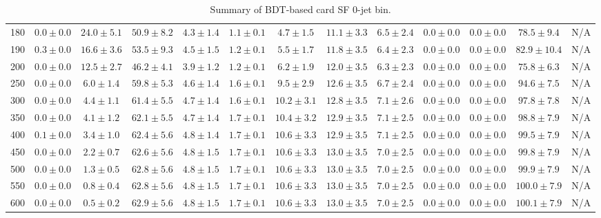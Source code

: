 \begin{table}
{\begin{center}
\begin{tabular}{l | c c | c c c c c c c c  | c c}
180 & $0.0\pm0.0$ & $24.0\pm5.1$ & $50.9\pm8.2$ & $4.3\pm1.4$ & $1.1\pm0.1$ & $4.7\pm1.5$ & $11.1\pm3.3$ & $6.5\pm2.4$ & $0.0\pm0.0$ & $0.0\pm0.0$ & $78.5\pm9.4$ & N/A \\
190 & $0.3\pm0.0$ & $16.6\pm3.6$ & $53.5\pm9.3$ & $4.5\pm1.5$ & $1.2\pm0.1$ & $5.5\pm1.7$ & $11.8\pm3.5$ & $6.4\pm2.3$ & $0.0\pm0.0$ & $0.0\pm0.0$ & $82.9\pm10.4$ & N/A \\
200 & $0.0\pm0.0$ & $12.5\pm2.7$ & $46.2\pm4.1$ & $3.9\pm1.2$ & $1.2\pm0.1$ & $6.2\pm1.9$ & $12.0\pm3.5$ & $6.3\pm2.3$ & $0.0\pm0.0$ & $0.0\pm0.0$ & $75.8\pm6.3$ & N/A \\
250 & $0.0\pm0.0$ & $6.0\pm1.4$ & $59.8\pm5.3$ & $4.6\pm1.4$ & $1.6\pm0.1$ & $9.5\pm2.9$ & $12.6\pm3.5$ & $6.7\pm2.4$ & $0.0\pm0.0$ & $0.0\pm0.0$ & $94.6\pm7.5$ & N/A \\
300 & $0.0\pm0.0$ & $4.4\pm1.1$ & $61.4\pm5.5$ & $4.7\pm1.4$ & $1.6\pm0.1$ & $10.2\pm3.1$ & $12.8\pm3.5$ & $7.1\pm2.6$ & $0.0\pm0.0$ & $0.0\pm0.0$ & $97.8\pm7.8$ &  N/A \\
350 & $0.0\pm0.0$ & $4.1\pm1.2$ & $62.1\pm5.5$ & $4.7\pm1.4$ & $1.7\pm0.1$ & $10.4\pm3.2$ & $12.9\pm3.5$ & $7.1\pm2.5$ & $0.0\pm0.0$ & $0.0\pm0.0$ & $98.8\pm7.9$ &  N/A \\
400 & $0.1\pm0.0$ & $3.4\pm1.0$ & $62.4\pm5.6$ & $4.8\pm1.4$ & $1.7\pm0.1$ & $10.6\pm3.3$ & $12.9\pm3.5$ & $7.1\pm2.5$ & $0.0\pm0.0$ & $0.0\pm0.0$ & $99.5\pm7.9$ &  N/A \\
450 & $0.0\pm0.0$ & $2.2\pm0.7$ & $62.6\pm5.6$ & $4.8\pm1.5$ & $1.7\pm0.1$ & $10.6\pm3.3$ & $13.0\pm3.5$ & $7.0\pm2.5$ & $0.0\pm0.0$ & $0.0\pm0.0$ & $99.8\pm7.9$ &  N/A \\
500 & $0.0\pm0.0$ & $1.3\pm0.5$ & $62.8\pm5.6$ & $4.8\pm1.5$ & $1.7\pm0.1$ & $10.6\pm3.3$ & $13.0\pm3.5$ & $7.0\pm2.5$ & $0.0\pm0.0$ & $0.0\pm0.0$ & $99.9\pm7.9$ &  N/A \\
550 & $0.0\pm0.0$ & $0.8\pm0.4$ & $62.8\pm5.6$ & $4.8\pm1.5$ & $1.7\pm0.1$ & $10.6\pm3.3$ & $13.0\pm3.5$ & $7.0\pm2.5$ & $0.0\pm0.0$ & $0.0\pm0.0$ & $100.0\pm7.9$ &  N/A \\
600 & $0.0\pm0.0$ & $0.5\pm0.2$ & $62.9\pm5.6$ & $4.8\pm1.5$ & $1.7\pm0.1$ & $10.6\pm3.3$ & $13.0\pm3.5$ & $7.0\pm2.5$ & $0.0\pm0.0$ & $0.0\pm0.0$ & $100.1\pm7.9$ &  N/A \\
\hline
\end{tabular}
\end{center}
}
\caption{Summary of BDT-based card SF 0-jet bin.}
\end{table}
